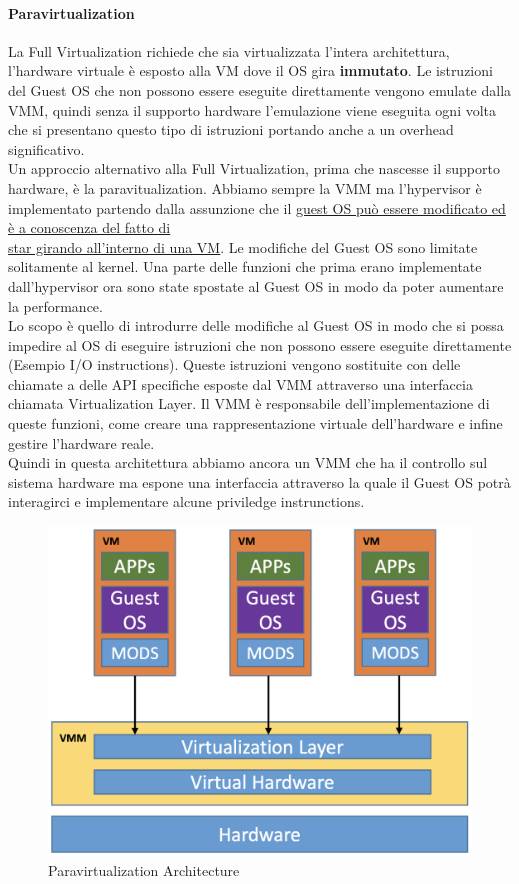 \documentclass{article}
\begin{document}
\paragraph{Paravirtualization}
La Full Virtualization richiede che sia virtualizzata l'intera architettura, l'hardware virtuale è esposto alla VM dove il OS gira \textbf{immutato}. Le istruzioni del Guest OS che non possono essere eseguite direttamente vengono emulate dalla VMM, quindi senza il supporto hardware l'emulazione viene eseguita ogni volta che si presentano questo tipo di istruzioni portando anche a un overhead significativo.\\
Un approccio alternativo alla Full Virtualization, prima che nascesse il supporto hardware, è la paravitualization. Abbiamo sempre la VMM ma l'hypervisor è implementato partendo dalla assunzione che il \underline{guest OS può essere modificato ed è a conoscenza del fatto di}\\ \underline{star girando all'interno di una VM}. Le modifiche del Guest OS sono limitate solitamente al kernel. Una parte delle funzioni che prima erano implementate dall'hypervisor ora sono state spostate al Guest OS in modo da poter aumentare la performance.\\
Lo scopo è quello di introdurre delle modifiche al Guest OS in modo che si possa impedire al OS di eseguire istruzioni che non possono essere eseguite direttamente (Esempio I/O instructions). Queste istruzioni vengono sostituite con delle chiamate a delle API specifiche esposte dal VMM attraverso una interfaccia chiamata Virtualization Layer. Il VMM è responsabile dell'implementazione di queste funzioni, come creare una rappresentazione virtuale dell'hardware e infine gestire l'hardware reale.\\
Quindi in questa architettura abbiamo ancora un VMM che ha il controllo sul sistema hardware ma espone una interfaccia attraverso la quale il Guest OS potrà interagirci e implementare alcune priviledge instrunctions.\\
\begin{figure}[H]
\centering
\includegraphics[scale=0.5]{img/Virt_tech/17.png}
\caption{Paravirtualization Architecture}
\end{figure}
\end{document}
